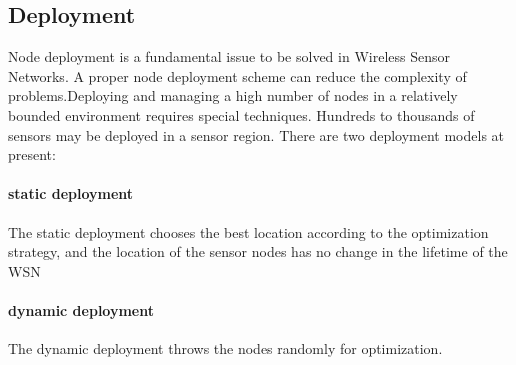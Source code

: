 	\subsection{Deployment}
	Node  deployment  is  a  fundamental  issue  to  be solved   in   Wireless   Sensor   Networks.   A   proper   node deployment scheme can reduce the complexity of problems.Deploying  and  managing  a  high  number  of  nodes  in  a relatively bounded environment requires special techniques. Hundreds  to  thousands  of  sensors  may  be  deployed  in  a sensor region. There are two deployment models at present:
	\paragraph{static  deployment} The  static deployment   chooses   the   best   location   according   to  the optimization  strategy,  and  the  location  of  the  sensor  nodes has  no  change  in  the lifetime of the  WSN
	 \paragraph{dynamic  deployment} The dynamic deployment throws the nodes randomly for optimization.  
	 
	 
	